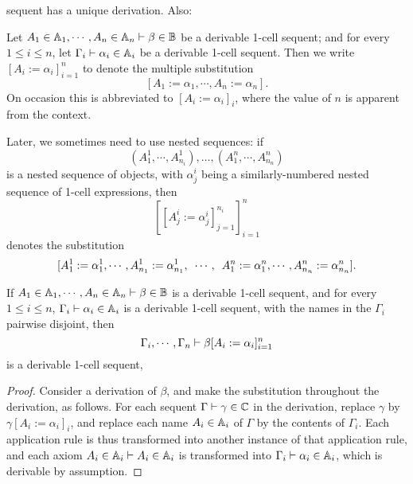 \documentclass{robinthesisdraft}
\begin{document}
sequent has a unique derivation. Also:
\begin{definition}
	Let $A_{1}\in\mathbb{A}_{1}, \cdots, A_{n}\in\mathbb{A}_{n}\vdash \beta\in\mathbb{B}$
	be a derivable 1-cell sequent; and for every $1\leq i\leq n$, let
	$\Gamma_{i} \vdash \alpha_{i}\in\mathbb{A}_{i}$ be a derivable 1-cell sequent.
	Then we write $[A_{i} := \alpha_{i}]_{i=1}^{n}$ to denote the multiple
	substitution
	\[
		[A_{1} := \alpha_{1}, \cdots, A_{n}:= \alpha_{n}].
	\]
	On occasion this is abbreviated to $[A_{i} := \alpha_{i}]_{i}$,
	where the value of $n$ is apparent from the context.
	
	Later, we sometimes need to use nested sequences: if
	\[
		(A^{1}_{1}, \cdots, A^{1}_{n_{i}}),
		\dots,
		(A^{n}_{1}, \cdots, A^{n}_{n_{n}})
	\]
	is a nested sequence of objects, with $\alpha^{i}_{j}$ being
	a similarly-numbered nested sequence of 1-cell expressions, then
	\[
		[[A^{i}_{j} := \alpha^{i}_{j}]_{j=1}^{n_{i}}]_{i=1}^{n}
	\]
	denotes the substitution
	\[
		[A^{1}_{1} := \alpha^{1}_{1}, \cdots, A^{1}_{n_{1}}:= \alpha^{1}_{n_{1}},
		\enskip\cdots,\enskip
		A^{n}_{1} := \alpha^{n}_{1}, \cdots, A^{n}_{n_{n}}:= \alpha^{n}_{n_{n}}
		].
	\]
\end{definition}
\begin{lemma}
	If $A_{1}\in\mathbb{A}_{1}, \cdots, A_{n}\in\mathbb{A}_{n}\vdash \beta\in\mathbb{B}$
	is a derivable 1-cell sequent, and for every $1\leq i\leq n$,
	$\Gamma_{i} \vdash \alpha_{i}\in\mathbb{A}_{i}$ is a derivable 1-cell sequent,
	with the names in the $\Gamma_{i}$ pairwise disjoint, then
	\[
		\Gamma_{i},\cdots,\Gamma_{n}\vdash \beta[A_{i} := \alpha_{i}]_{i=1}^{n}
	\]
	is a derivable 1-cell sequent,
\end{lemma}
\begin{proof}
	Consider a derivation of $\beta$, and make the substitution
	throughout the derivation, as follows. For each sequent
	$\Gamma\vdash \gamma\in\mathbb{C}$ in the derivation, replace $\gamma$
	by $\gamma[A_{i} := \alpha_{i}]_{i}$, and replace each name
	$A_{i}\in\mathbb{A}_{i}$ of $\Gamma$ by the contents of $\Gamma_{i}$.
	Each application rule is thus transformed
	into another instance of that application rule, and each axiom
	$A_{i}\in\mathbb{A}_{i} \vdash A_{i}\in\mathbb{A}_{i}$
	is transformed into $\Gamma_{i}\vdash \alpha_{i}\in\mathbb{A}_{i}$, which is
	derivable by assumption.
\end{proof}
\end{document}
